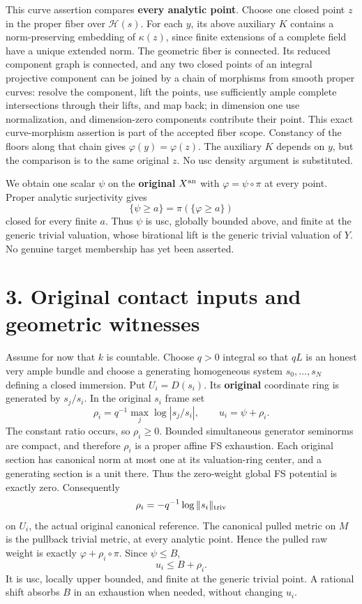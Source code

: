 \documentclass[
  10pt,
]{article}
\begin{document}
This curve assertion compares \textbf{every analytic point}. Choose one
closed point \(z\) in the proper fiber over \(\mathcal H(s)\). For each
\(y\), its above auxiliary \(K\) contains a norm-preserving embedding of
\(\kappa(z)\), since finite extensions of a complete field have a unique
extended norm. The geometric fiber is connected. Its reduced component
graph is connected, and any two closed points of an integral projective
component can be joined by a chain of morphisms from smooth proper
curves: resolve the component, lift the points, use sufficiently ample
complete intersections through their lifts, and map back; in dimension
one use normalization, and dimension-zero components contribute their
point. This exact curve-morphism assertion is part of the accepted fiber
scope. Constancy of the floors along that chain gives
\(\varphi(y)=\varphi(z)\). The auxiliary \(K\) depends on \(y\), but the
comparison is to the same original \(z\). No usc density argument is
substituted.

We obtain one scalar \(\psi\) on the \textbf{original} \(X^{\rm an}\)
with \(\varphi=\psi\circ\pi\) at every point. Proper analytic
surjectivity gives \[\{\psi\ge a\}=\pi(\{\varphi\ge a\})\] closed for
every finite \(a\). Thus \(\psi\) is usc, globally bounded above, and
finite at the generic trivial valuation, whose birational lift is the
generic trivial valuation of \(Y\). No genuine target membership has yet
been asserted.

\section{3. Original contact inputs and geometric
witnesses}\label{original-contact-inputs-and-geometric-witnesses}

Assume for now that \(k\) is countable. Choose \(q>0\) integral so that
\(qL\) is an honest very ample bundle and choose a generating
homogeneous system \(s_0,\ldots,s_N\) defining a closed immersion. Put
\(U_i=D(s_i)\). Its \textbf{original} coordinate ring is generated by
\(s_j/s_i\). In the original \(s_i\) frame set
\[\rho_i=q^{-1}\max_j\log|s_j/s_i|,\qquad u_i=\psi+\rho_i.\] The
constant ratio occurs, so \(\rho_i\ge0\). Bounded simultaneous generator
seminorms are compact, and therefore \(\rho_i\) is a proper affine FS
exhaustion. Each original section has canonical norm at most one at its
valuation-ring center, and a generating section is a unit there. Thus
the zero-weight global FS potential is exactly zero. Consequently
\[\rho_i=-q^{-1}\log\|s_i\|_{\rm triv}\] on \(U_i\), the actual original
canonical reference. The canonical pulled metric on \(M\) is the
pullback trivial metric, at every analytic point. Hence the pulled raw
weight is exactly \(\varphi+\rho_i\circ\pi\). Since \(\psi\le B\),
\[u_i\le B+\rho_i.\] It is usc, locally upper bounded, and finite at the
generic trivial point. A rational shift absorbs \(B\) in an exhaustion
when needed, without changing \(u_i\).
\end{document}
